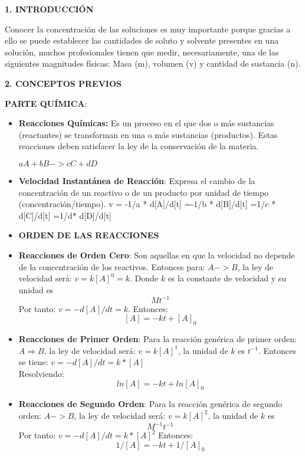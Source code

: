 \documentclass[10pt,a4paper]{article}
\begin{document}
\begin{multicols}{2}
\begin{center}
{\large \bf 1. INTRODUCCI\'ON}
\end{center}
Conocer la concentración de las soluciones es muy importante porque gracias a ello se puede establecer las cantidades de soluto y solvente presentes en una solución, muchos profesionales tienen que medir, necesariamente, una de las siguientes magnitudes físicas: Masa (m), volumen (v) y cantidad de sustancia (n). \\
 

\begin{center}
{\large \bf 2. CONCEPTOS PREVIOS}
\end{center}
\noindent \textbf{PARTE QUÍMICA}:

\begin{itemize}

	\item \textbf{Reacciones Químicas:} Es un proceso en el que dos o más sustancias (reactantes) se transforman en una o más sustancias (productos). Estas reacciones deben satisfacer la ley de la conservación de la materia.
    \begin{center}
		$aA  +  bB  ->  cC  +  dD$
    \end{center}
	\item \textbf{Velocidad Instantánea de Reacción}: Expresa el cambio de la concentración de un reactivo o de un producto por unidad de tiempo (concentración/tiempo).
	{\scriptsize
	         v = -1/a * d[A]/d[t] =-1/b * d[B]/d[t] =1/c * d[C]/d[t] =1/d* d[D]/d[t] 
	}

	\item \textbf{ORDEN DE LAS REACCIONES}
	\item \textbf{Reacciones de Orden Cero}: Son aquellas en que la velocidad no depende de la concentración de los reactivos. Entonces para: $A -> B$, la ley de velocidad será: $v=k[A]^0=k$. Donde $k$ es la constante de velocidad y su unidad es \[Mt^{-1}\] Por tanto:
	$v=-d[A]/dt=k$.
	Entonces:  \[[A]=-kt+[A]_0\]

	\item \textbf{Reacciones de Primer Orden}: Para la reacción genérica de primer orden: $A \Rightarrow B$, la ley de velocidad será: $v=k[A]^1$, la unidad de $k$ es $t^{-1}$. Entonces se tiene:
	$v=-d[A]/dt=k*[A]$\\
	Resolviendo:   \[ln[A]=-kt+ ln[A]_0\]
	
	\item \textbf{Reacciones de Segundo Orden}: Para la reacción genérica de segundo orden: $A ->B$, la ley de velocidad será: $v=k[A]^2$, la unidad de $k$ es \[M^{-1} t^{-1}\]
	Por tanto: 
	$v=-d[A]/dt=k*[A]^2$
	Entonces: \[1/[A] =-kt+  1/[A]_0 \]



\end{itemize}
\end{multicols}
\end{document}

